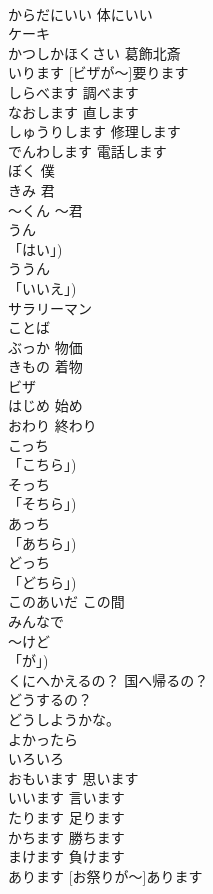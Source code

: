 \documentclass[8pt]{extreport}
\begin{document}
\begin{CJK}{UTF8}{min}
\\	からだにいい	体にいい	
\\	ケーキ			
\\	かつしかほくさい	葛飾北斎	
\\	[ビザが～]いります	[ビザが～]要ります	
\\	しらべます	調べます	
\\	なおします	直します	
\\	しゅうりします	修理します	
\\	でんわします	電話します	
\\	ぼく	僕	
\\	きみ	君	
\\	～くん	～君	
\\	うん			
\\	「はい」)		
\\	ううん			
\\	「いいえ」)		
\\	サラリーマン			
\\	ことば			
\\	ぶっか	物価	
\\	きもの	着物	
\\	ビザ			
\\	はじめ	始め	
\\	おわり	終わり	
\\	こっち			
\\	「こちら」)		
\\	そっち			
\\	「そちら」)		
\\	あっち			
\\	「あちら」)		
\\	どっち			
\\	「どちら」)		
\\	このあいだ	この間	
\\	みんなで			
\\	～けど			
\\	「が」)		
\\	くにへかえるの？	国へ帰るの？	
\\	どうするの？			
\\	どうしようかな。			
\\	よかったら			
\\	いろいろ			
\\	おもいます	思います	
\\	いいます	言います	
\\	たります	足ります	
\\	かちます	勝ちます	
\\	まけます	負けます	
\\	[おまつりが～] あります	[お祭りが～]あります	

\end{CJK}
\end{document}
